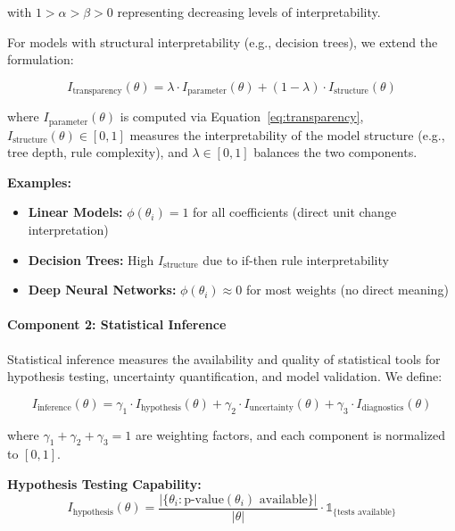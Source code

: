 \documentclass[11pt,a4paper]{article}
\begin{document}
with $1 > \alpha > \beta > 0$ representing decreasing levels of interpretability.

For models with structural interpretability (e.g., decision trees), we extend the formulation:

\begin{equation}
I_{\text{transparency}}(\theta) = \lambda \cdot I_{\text{parameter}}(\theta) + (1-\lambda) \cdot I_{\text{structure}}(\theta)
\end{equation}

where $I_{\text{parameter}}(\theta)$ is computed via Equation~\ref{eq:transparency}, $I_{\text{structure}}(\theta) \in [0,1]$ measures the interpretability of the model structure (e.g., tree depth, rule complexity), and $\lambda \in [0,1]$ balances the two components.

\textbf{Examples:}
\begin{itemize}
    \item \textbf{Linear Models:} $\phi(\theta_i) = 1$ for all coefficients (direct unit change interpretation)
    \item \textbf{Decision Trees:} High $I_{\text{structure}}$ due to if-then rule interpretability
    \item \textbf{Deep Neural Networks:} $\phi(\theta_i) \approx 0$ for most weights (no direct meaning)
\end{itemize}

\paragraph{Component 2: Statistical Inference}

Statistical inference measures the availability and quality of statistical tools for hypothesis testing, uncertainty quantification, and model validation. We define:

\begin{equation}
I_{\text{inference}}(\theta) = \gamma_1 \cdot I_{\text{hypothesis}}(\theta) + \gamma_2 \cdot I_{\text{uncertainty}}(\theta) + \gamma_3 \cdot I_{\text{diagnostics}}(\theta)
\label{eq:inference}
\end{equation}

where $\gamma_1 + \gamma_2 + \gamma_3 = 1$ are weighting factors, and each component is normalized to $[0,1]$.

\textbf{Hypothesis Testing Capability:}
\begin{equation}
I_{\text{hypothesis}}(\theta) = \frac{|\{\theta_i : \text{p-value}(\theta_i) \text{ available}\}|}{|\theta|} \cdot \mathbb{1}_{\{\text{tests available}\}}
\end{equation}
\end{document}
